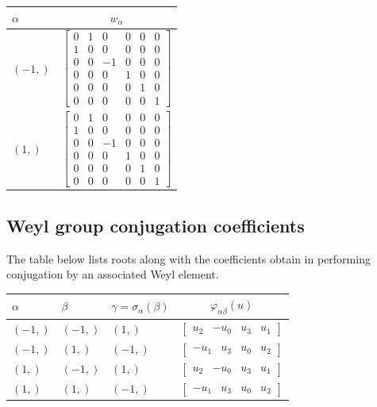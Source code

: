 \documentclass[11pt]{article}
\newcommand{\noi}{\noindent}
\theoremstyle{definition}
\begin{document}
\noi \noindent \begin{longtable}{|l|c|}
    \hline
    $\alpha$ & $w_\alpha$ \\
    \hline
    \endhead
    $\left( -1,\right)$ & ${\left[\begin{matrix}0 & 1 & 0 & 0 & 0 & 0\\1 & 0 & 0 & 0 & 0 & 0\\0 & 0 & -1 & 0 & 0 & 0\\0 & 0 & 0 & 1 & 0 & 0\\0 & 0 & 0 & 0 & 1 & 0\\0 & 0 & 0 & 0 & 0 & 1\end{matrix}\right]}$ \\
    \hline
    $\left( 1,\right)$ & ${\left[\begin{matrix}0 & 1 & 0 & 0 & 0 & 0\\1 & 0 & 0 & 0 & 0 & 0\\0 & 0 & -1 & 0 & 0 & 0\\0 & 0 & 0 & 1 & 0 & 0\\0 & 0 & 0 & 0 & 1 & 0\\0 & 0 & 0 & 0 & 0 & 1\end{matrix}\right]}$ \\
    \hline
\end{longtable}


\subsection{Weyl group conjugation coefficients}

The table below lists roots along with the coefficients obtain in performing conjugation by an associated Weyl element.

\bigskip

\noi \noindent \begin{longtable}{|l|l|l|c|}
    \hline
    \textbf{$\alpha$} & \textbf{$\beta$} & \textbf{$\gamma = \sigma_{\alpha}(\beta)$} & $\varphi_{\alpha\beta}(u)$ \\
    \hline
    \endhead
    $\left( -1,\right)$ & $\left( -1,\right)$ & $\left( 1,\right)$ & $\left[\begin{matrix}u_{2} & - u_{0} & u_{3} & u_{1}\end{matrix}\right]$ \\
    \hline
    $\left( -1,\right)$ & $\left( 1,\right)$ & $\left( -1,\right)$ & $\left[\begin{matrix}- u_{1} & u_{3} & u_{0} & u_{2}\end{matrix}\right]$ \\
    \hline
    $\left( 1,\right)$ & $\left( -1,\right)$ & $\left( 1,\right)$ & $\left[\begin{matrix}u_{2} & - u_{0} & u_{3} & u_{1}\end{matrix}\right]$ \\
    \hline
    $\left( 1,\right)$ & $\left( 1,\right)$ & $\left( -1,\right)$ & $\left[\begin{matrix}- u_{1} & u_{3} & u_{0} & u_{2}\end{matrix}\right]$ \\
    \hline
\end{longtable}
\end{document}
